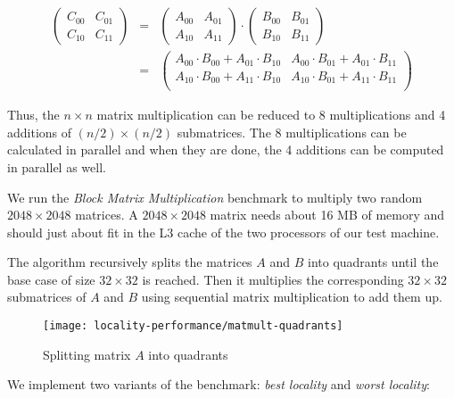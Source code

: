 \begin{eqnarray*}
  \begin{pmatrix}
    C_{00} & C_{01} \\
    C_{10} & C_{11}
  \end{pmatrix}
  &
  =
  &
  \begin{pmatrix}
    A_{00} & A_{01} \\
    A_{10} & A_{11}
  \end{pmatrix}
  \cdot
  \begin{pmatrix}
    B_{00} & B_{01} \\
    B_{10} & B_{11}
  \end{pmatrix}
  \\[0.3cm]
  &
  =
  &
  \begin{pmatrix}
    A_{00} \cdot B_{00} + A_{01} \cdot B_{10} & A_{00} \cdot B_{01} + A_{01} \cdot B_{11} \\
    A_{10} \cdot B_{00} + A_{11} \cdot B_{10} & A_{10} \cdot B_{01} + A_{11} \cdot B_{11} \\
  \end{pmatrix}
\end{eqnarray*}

\vspace{0.5cm}

Thus, the $n \times n$ matrix multiplication can be reduced to 8
multiplications and 4 additions of $(n/2) \times (n/2)$
submatrices. The 8 multiplications can be calculated in parallel and
when they are done, the 4 additions can be computed in parallel as
well.

We run the \emph{Block Matrix Multiplication} benchmark to multiply
two random $2048 \times 2048$ matrices. A $2048 \times 2048$ matrix
needs about 16 MB of memory and should just about fit in the L3 cache
of the two processors of our test machine. 

The algorithm recursively splits the matrices $A$ and $B$ into
quadrants until the base case of size $32 \times 32$ is reached. Then
it multiplies the corresponding $32 \times 32$ submatrices of $A$ and
$B$ using sequential matrix multiplication to add them up.

\begin{figure}[!ht]
  \centering
  \texttt{[image: locality-performance/matmult-quadrants]}
  \caption{Splitting matrix $A$ into quadrants}
  \label{fig:locality-performance-matmult-quadrants}
\end{figure}

We implement two variants of the benchmark: \emph{best locality} and
\emph{worst locality}:

